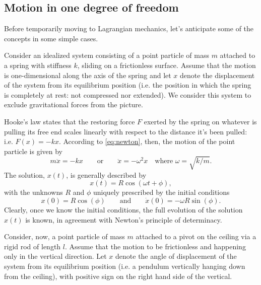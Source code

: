 \documentclass[english,fontsize=11pt,paper=a5,oneside]{scrbook}
\theoremstyle{definition}
\newenvironment{example}
  {\pushQED{\qed}\renewcommand{\qedsymbol}{$\lozenge$}\examplex}
  {\popQED\endexamplex}
\begin{document}
\subsection{Motion in one degree of freedom}

Before temporarily moving to Lagrangian mechanics, let's anticipate some of the concepts in some simple cases.

\begin{example}[Horizontal spring and pendulum]\label{ex:sprPen}

    Consider an idealized system consisting of a point particle of mass $m$ attached to a spring with stiffness $k$, sliding on a frictionless surface.
    Assume that the motion is one-dimensional along the axis of the spring and let $x$ denote the displacement of the system from its equilibrium position (i.e. the position in which the spring is completely at rest: not compressed nor extended). We consider this system to exclude gravitational forces from the picture.
    
    Hooke's law states that the restoring force $F$ exerted by the spring on whatever is pulling its free end scales linearly with respect to the distance it's been pulled: i.e. $F(x) = - k x$. According to \eqref{eq:newton}, then, the motion of the point particle is given by
    \begin{equation}\label{eq:spring}
        m \ddot{x} = - k x \qquad\mbox{or}\qquad \ddot{x} = - \omega^2 x \quad\mbox{where } \omega = \sqrt{k/m}.
    \end{equation}
    The solution, $x(t)$, is generally described by 
    \begin{equation}\label{eq:springsol}
        x(t) = R \cos(\omega t + \phi),
    \end{equation} with the unknowns $R$ and $\phi$ uniquely prescribed by the initial conditions
    \begin{equation}
        x(0) = R\cos(\phi) \qquad\mbox{and}\qquad \dot x(0) = -\omega R \sin(\phi).
    \end{equation}
    Clearly, once we know the initial conditions, the full evolution of the solution $x(t)$ is known, in agreement with Newton's principle of determinacy.
\medskip

    Consider, now, a point particle of mass $m$ attached to a pivot on the ceiling via a rigid rod of length $l$.
    Assume that the motion to be frictionless and happening only in the vertical direction.
    Let $x$ denote the angle of displacement of the system from its equilibrium position (i.e. a pendulum vertically hanging down from the ceiling), with positive sign on the right hand side of the vertical.
    

\end{example}
\end{document}
